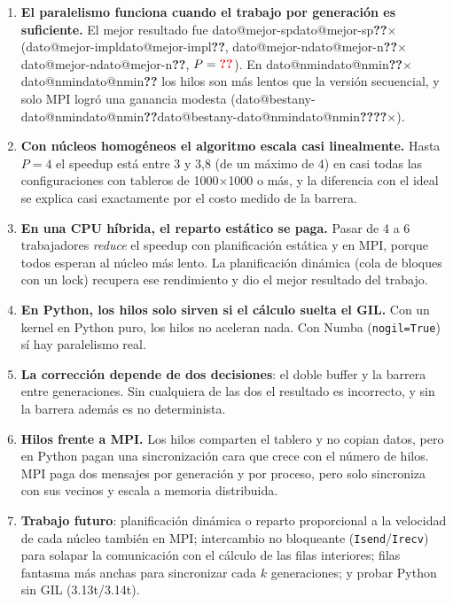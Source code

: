 \documentclass[11pt,a4paper]{article}
\makeatletter
\newcommand{\dato}[1]{\ifcsname dato@#1\endcsname\csname dato@#1\endcsname\else\textbf{\color{red}??}\fi}
\newcommand{\x}{$\times$}
\newcommand{\code}[1]{\texttt{#1}}
\makeatother
\begin{document}
\begin{enumerate}
  \item \textbf{El paralelismo funciona cuando el trabajo por generación es suficiente.} El mejor resultado fue
        \dato{mejor-sp}\x{} (\dato{mejor-impl}, \dato{mejor-n}\x\dato{mejor-n}, $P=\dato{mejor-p}$). En
        \dato{nmin}\x\dato{nmin} los hilos son más lentos que la versión secuencial, y solo MPI logró una ganancia
        modesta (\dato{bestany-\dato{nmin}}\x).
  \item \textbf{Con núcleos homogéneos el algoritmo escala casi linealmente.} Hasta $P=4$ el speedup está entre 3 y
        3,8 (de un máximo de 4) en casi todas las configuraciones con tableros de 1000\x1000 o más, y la diferencia
        con el ideal se explica casi exactamente por el costo medido de la barrera.
  \item \textbf{En una CPU híbrida, el reparto estático se paga.} Pasar de 4 a 6 trabajadores \emph{reduce} el speedup
        con planificación estática y en MPI, porque todos esperan al núcleo más lento. La planificación dinámica (cola
        de bloques con un lock) recupera ese rendimiento y dio el mejor resultado del trabajo.
  \item \textbf{En Python, los hilos solo sirven si el cálculo suelta el GIL.} Con un kernel en Python puro, los
        hilos no aceleran nada. Con Numba (\code{nogil=True}) sí hay paralelismo real.
  \item \textbf{La corrección depende de dos decisiones}: el doble buffer y la barrera entre generaciones. Sin
        cualquiera de las dos el resultado es incorrecto, y sin la barrera además es no determinista.
  \item \textbf{Hilos frente a MPI.} Los hilos comparten el tablero y no copian datos, pero en Python pagan una
        sincronización cara que crece con el número de hilos. MPI paga dos mensajes por generación y por proceso, pero
        solo sincroniza con sus vecinos y escala a memoria distribuida.
  \item \textbf{Trabajo futuro}: planificación dinámica o reparto proporcional a la velocidad de cada núcleo también
        en MPI; intercambio no bloqueante (\code{Isend}/\code{Irecv}) para solapar la comunicación con el cálculo de
        las filas interiores; filas fantasma más anchas para sincronizar cada $k$ generaciones; y probar Python sin
        GIL (3.13t/3.14t).
\end{enumerate}

\appendix
\end{document}
